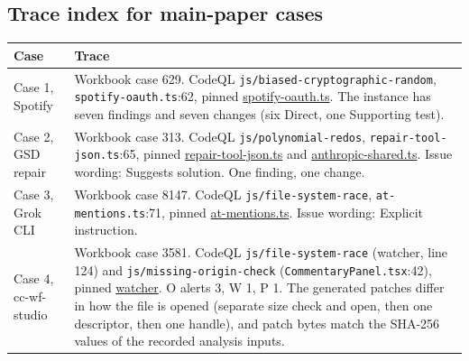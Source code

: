 \subsection*{Trace index for main-paper cases}
{\footnotesize\renewcommand{\arraystretch}{1.15}
\begin{tabular}{@{}p{2.6cm}p{9.9cm}@{}}
\toprule
\textbf{Case} & \textbf{Trace}\\
\midrule
Case 1, Spotify & Workbook case 629. CodeQL \texttt{js/biased-cryptographic-random}, \texttt{spotify-oauth.ts}:62, pinned \href{https://github.com/ZHANGTIANYAO1/teamspeak-music-bot/blob/1a3ccd0e38d285a4676fcbb4ee4809d1cd0c9f2a/src/music/spotify/spotify-oauth.ts}{spotify-oauth.ts}. The instance has seven findings and seven changes (six Direct, one Supporting test).\\
Case 2, GSD repair & Workbook case 313. CodeQL \texttt{js/polynomial-redos}, \texttt{repair-tool-json.ts}:65, pinned \href{https://github.com/gsd-build/gsd-2/blob/42b4470fbc2bbb4944ae5f3f36c99640b24efd06/packages/pi-ai/src/utils/repair-tool-json.ts}{repair-tool-json.ts} and \href{https://github.com/gsd-build/gsd-2/blob/42b4470fbc2bbb4944ae5f3f36c99640b24efd06/packages/pi-ai/src/providers/anthropic-shared.ts}{anthropic-shared.ts}. Issue wording: Suggests solution. One finding, one change.\\
Case 3, Grok CLI & Workbook case 8147. CodeQL \texttt{js/file-system-race}, \texttt{at-mentions.ts}:71, pinned \href{https://github.com/superagent-ai/grok-cli/blob/75e5c0a6e51621b954e053e87494af4ffc5b5b8d/src/utils/at-mentions.ts}{at-mentions.ts}. Issue wording: Explicit instruction.\\
Case 4, cc-wf-studio & Workbook case 3581. CodeQL \texttt{js/file-system-race} (watcher, line 124) and \texttt{js/missing-origin-check} (\texttt{CommentaryPanel.tsx}:42), pinned \href{https://github.com/breaking-brake/cc-wf-studio/blob/bb7ddadd4e17c9ace31ed2e3a59eb8e3070150ee/src/extension/services/commentary-jsonl-watcher.ts}{watcher}. O alerts 3, W 1, P 1. The generated patches differ in how the file is opened (separate size check and open, then one descriptor, then one handle), and patch bytes match the SHA-256 values of the recorded analysis inputs.\\
\bottomrule
\end{tabular}}

